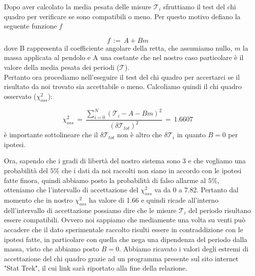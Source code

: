Dopo aver calcolato la media pesata delle misure $\mathcal{T}_i$ sfruttiamo il test del chi quadro per verificare se sono compatibili o meno. Per questo motivo defiano la seguente funzione $f$

\begin{equation}
	f \,:=\, A + B m 
\end{equation}
%
dove B rappresenta il coefficiente angolare della retta, che assumiamo nullo, $m$ la massa applicata al pendolo e A una costante che nel nostro caso particolare è il valore della media pesata dei periodi ($\mathcal{T}$).\\
Pertanto ora procediamo nell'eseguire il test del chi quadro per accertarci se il risultato da noi trovato sia accettabile o meno. Calcoliamo quindi il chi quadro osservato ($\chi_{oss}^2$):

\begin{equation*}
	\chi_{oss}^2 \,=\, \frac{\sum_{i=0}^{N} (\mathcal{T}_i - A - B m)^2}{(\delta \mathcal{T}_{tot})^2} \,=\, 1.6607
\end{equation*}
%
è importante sottolineare che il $\delta \mathcal{T}_{tot}$ non è altro che $\delta \mathcal{T}_i$ in quanto $B = 0$ per ipotesi.

Ora, sapendo che i gradi di libertà del nostro sistema sono 3 e che vogliamo una probabilità del $5\%$ che i dati da noi raccolti non siano in accordo con le ipotesi fatte finora, quindi abbiamo posto la probabilità di falso allarme al $5\%$, otteniamo che l'intervallo di accettazione del $\chi_{oss}^2$ va da 0 a 7.82. Pertanto dal momento che in nostro $\chi_{oss}^2$ ha valore di 1.66 e quindi ricade all'interno dell'intervallo di accettazione possiamo dire che le misure $\mathcal{T}_i$ del periodo risultano essere compatibili. Ovvero noi sappiamo che mediamente una volta su venti può accadere che il dato sperimentale raccolto risulti essere in contraddizione con le ipotesi fatte, in particolare con quella che nega una dipendenza del periodo dalla massa, visto che abbiamo posto $B = 0$.
Abbiamo ricavato i valori degli estremi di accettazione del chi quadro grazie ad un programma presente sul sito internet "Stat Trek", il cui link sarà riportato alla fine della relazione.